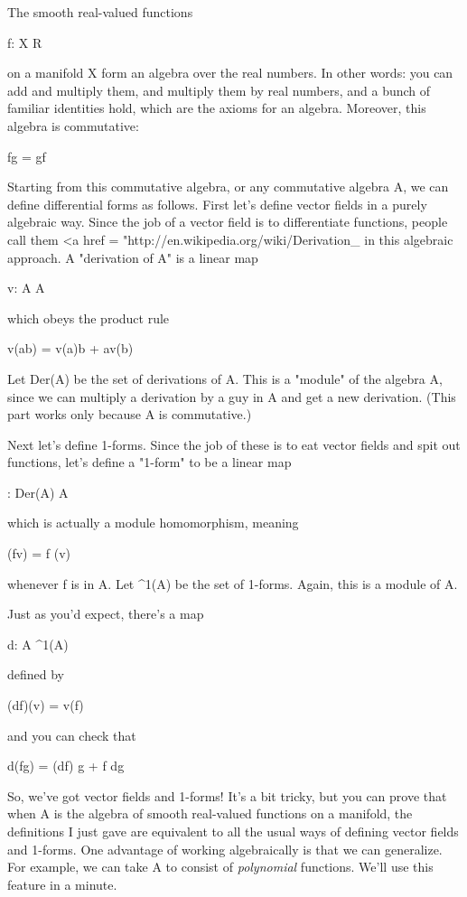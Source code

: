 The smooth real-valued functions

f: X \to  R

on a manifold X form an algebra over the real numbers.  In other
words: you can add and multiply them, and multiply them by real
numbers, and a bunch of familiar identities hold, which are the axioms
for an algebra.  Moreover, this algebra is commutative:

fg = gf

Starting from this commutative algebra, or any commutative algebra A,
we can define differential forms as follows.  First let's define
vector fields in a purely algebraic way.  Since the job of a vector
field is to differentiate functions, people call them 
<a href = "http://en.wikipedia.org/wiki/Derivation_%
in this algebraic approach.  A "derivation of A" is a linear map

v: A \to  A

which obeys the product rule

v(ab) = v(a)b + av(b)

Let Der(A) be the set of derivations of A.  This is a "module" of the
algebra A, since we can multiply a derivation by a guy in A and get a
new derivation.  (This part works only because A is commutative.)

Next let's define 1-forms.  Since the job of these is to eat vector
fields and spit out functions, let's define a "1-form" to be a linear 
map

\omega : Der(A) \to  A

which is actually a module homomorphism, meaning

\omega (fv) = f \omega (v)

whenever f is in A.  Let \Omega ^{1}(A) be the set of 1-forms.  Again,
this is a module of A.  

Just as you'd expect, there's a map 

d: A \to  \Omega ^{1}(A)

defined by 

(df)(v) = v(f)

and you can check that

d(fg) = (df) g + f dg

So, we've got vector fields and 1-forms!  It's a bit tricky, but you
can prove that when A is the algebra of smooth real-valued functions
on a manifold, the definitions I just gave are equivalent to all the
usual ways of defining vector fields and 1-forms.  One advantage
of working algebraically is that we can generalize.  For example, we
can take A to consist of \emph{polynomial} functions.  We'll use this
feature in a minute.

